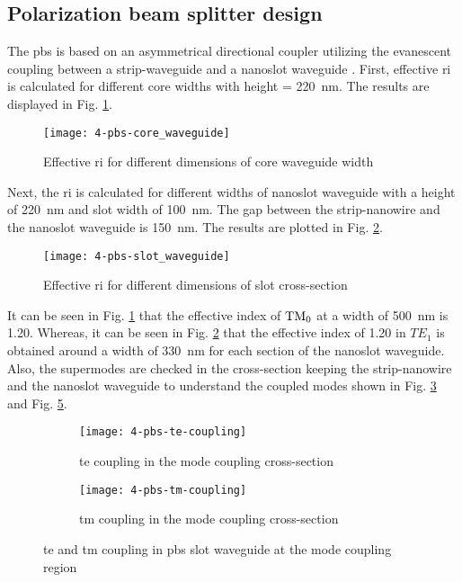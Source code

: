 \documentclass[../report.tex]{subfiles}
\begin{document}
\subsection{Polarization beam splitter design}
The \gls{pbs} is based on an asymmetrical directional coupler utilizing the evanescent coupling between a strip-waveguide and a nanoslot waveguide \cite{pbs_dai_2011}. First, effective \gls{ri} is calculated for different core widths with height = \SI{220}{\nano \meter}. The results are displayed in Fig. \ref{fig:4_pbs_core_waveguide}.
\begin{figure}[H] %
	\centering
	\texttt{[image: 4-pbs-core\_waveguide]}
	\caption{Effective \gls{ri} for different dimensions of core waveguide width}
	\label{fig:4_pbs_core_waveguide}
\end{figure}
\noindent Next, the \gls{ri} is calculated for different widths of nanoslot waveguide with a height of \SI{220}{\nano \meter} and slot width of \SI{100}{\nano \meter}. The gap between the strip-nanowire and the nanoslot waveguide is \SI{150}{\nano \meter}. The results are plotted in Fig. \ref{fig:4_pbs_slot_waveguide}.
\begin{figure}[H] %
	\centering
	\texttt{[image: 4-pbs-slot\_waveguide]}
	\caption{Effective \gls{ri} for different dimensions of slot cross-section}
	\label{fig:4_pbs_slot_waveguide}
\end{figure}
\noindent It can be seen in Fig. \ref{fig:4_pbs_core_waveguide} that the effective index of $\mathrm{TM_0}$ at a width of \SI{500}{\nano \meter} is 1.20. Whereas, it can be seen in Fig. \ref{fig:4_pbs_slot_waveguide} that the effective index of 1.20 in $TE_1$ is obtained around a width of \SI{330}{\nano \meter} for each section of the nanoslot waveguide. Also, the supermodes are checked in the cross-section keeping the strip-nanowire and the nanoslot waveguide to understand the coupled modes shown in Fig. \ref{fig:4_pbs_te_coupling} and Fig. \ref{fig:4_pbs_tm_coupling}.
\begin{figure}[H] %
	\begin{subfigure}[t]{0.45\textwidth}
		\texttt{[image: 4-pbs-te-coupling]}
		\caption{\gls{te} coupling in the mode coupling cross-section}
		\label{fig:4_pbs_te_coupling}
	\end{subfigure}
	\hfill
	\begin{subfigure}[t]{0.45\textwidth}
		\texttt{[image: 4-pbs-tm-coupling]}
		\caption{\gls{tm} coupling in the mode coupling cross-section}
		\label{fig:4_pbs_tm_coupling}
	\end{subfigure}
	\caption{\gls{te} and \gls{tm} coupling in \gls{pbs} slot waveguide at the mode coupling region}
\end{figure}
\end{document}
